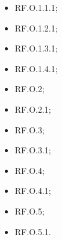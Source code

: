 \documentclass[10pt, a4paper]{article}
\begin{document}
\begin{itemize}
    \item RF.O.1.1.1; %
    \item RF.O.1.2.1;%
    \item RF.O.1.3.1; %
    \item RF.O.1.4.1; %
    \item RF.O.2;
    \item RF.O.2.1;
    \item RF.O.3;
    \item RF.O.3.1;
    \item RF.O.4;
    \item RF.O.4.1;
    \item RF.O.5;
    \item RF.O.5.1.



\end{itemize}
\end{document}
